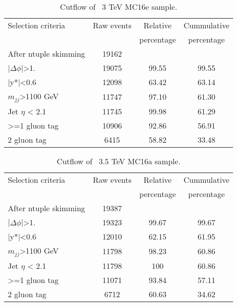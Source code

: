 \begin{table}[ht]
\begin{center}
\begin{tabular}{|l|c|c|c|}
\hline
Selection criteria & Raw events &  Relative & Cummulative \\
 & & percentage & percentage \\
\hline
After ntuple skimming & 19162 &  &  \\
$|\Delta\phi|$>1. & 19075 & 99.55 & 99.55 \\
|y*|<0.6 & 12098 & 63.42 & 63.14 \\
$m_{jj}$>1100 GeV & 11747 & 97.10 & 61.30 \\
Jet $\eta$ < 2.1 & 11745 & 99.98 & 61.29 \\
>=1 gluon tag & 10906 & 92.86 & 56.91 \\
2 gluon tag & 6415 & 58.82 & 33.48 \\
\hline
\end{tabular}
\end{center}
\caption{Cutflow of \Hprime\ 3 TeV MC16e sample.}
\end{table}

\begin{table}[ht]
\begin{center}
\begin{tabular}{|l|c|c|c|}
\hline
Selection criteria & Raw events &  Relative & Cummulative \\
 & & percentage & percentage \\
\hline
After ntuple skimming & 19387 &  &  \\
$|\Delta\phi|$>1. & 19323 & 99.67 & 99.67 \\
|y*|<0.6 & 12010 & 62.15 & 61.95 \\
$m_{jj}$>1100 GeV & 11798 & 98.23 & 60.86 \\
Jet $\eta$ < 2.1 & 11798 & 100 & 60.86 \\
>=1 gluon tag & 11071 & 93.84 & 57.11 \\
2 gluon tag & 6712 & 60.63 & 34.62 \\
\hline
\end{tabular}
\end{center}
\caption{Cutflow of \Hprime\ 3.5 TeV MC16a sample.}
\end{table}

